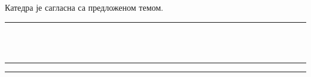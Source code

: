 \documentclass[a4paper]{article}
\begin{document}
\vspace{1cm}


\begin{flushleft}
Катедра  је сагласна са предложеном темом.
\vspace{-3mm}
\hspace*{13mm} \rule[2.3cm]{9.5cm}{.05mm}\\
\vspace{-1cm}
\makebox[6.5cm][c]{} \hfill \makebox[6.5cm][c]{}\\
\rule[4mm]{6.5cm}{.05mm} \hfill \rule[4mm]{6.5cm}{.05mm}\\
\vspace{-5mm}
 \hfill {}
\end{flushleft}
\end{document}
